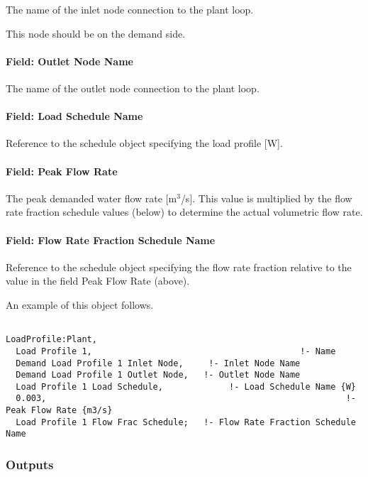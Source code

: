 The name of the inlet node connection to the plant loop.

This node should be on the demand side.

\paragraph{Field: Outlet Node Name}\label{field-outlet-node-name-003}

The name of the outlet node connection to the plant loop.

\paragraph{Field: Load Schedule Name}\label{field-load-schedule-name}

Reference to the schedule object specifying the load profile {[}W{]}.

\paragraph{Field: Peak Flow Rate}\label{field-peak-flow-rate}

The peak demanded water flow rate {[}m\(^{3}\)/s{]}. This value is multiplied by the flow rate fraction schedule values (below) to determine the actual volumetric flow rate.

\paragraph{Field: Flow Rate Fraction Schedule Name}\label{field-flow-rate-fraction-schedule-name}

Reference to the schedule object specifying the flow rate fraction relative to the value in the field Peak Flow Rate (above).

An example of this object follows.

\begin{lstlisting}

LoadProfile:Plant,
  Load Profile 1,                                         !- Name
  Demand Load Profile 1 Inlet Node,     !- Inlet Node Name
  Demand Load Profile 1 Outlet Node,   !- Outlet Node Name
  Load Profile 1 Load Schedule,             !- Load Schedule Name {W}
  0.003,                                                           !- Peak Flow Rate {m3/s}
  Load Profile 1 Flow Frac Schedule;   !- Flow Rate Fraction Schedule Name
\end{lstlisting}

\subsubsection{Outputs}\label{outputs-020}


